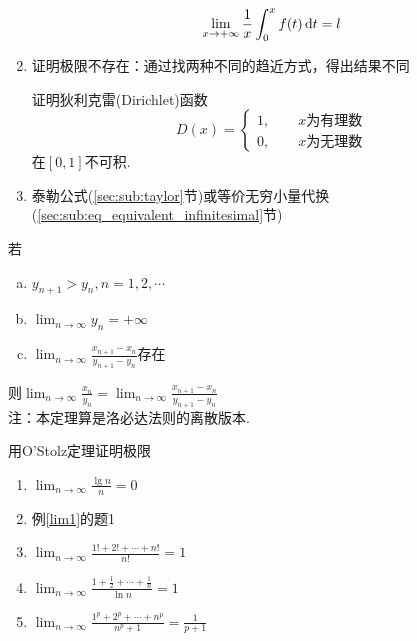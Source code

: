 \begin{enumerate}
\begin{exercise}
	\[\lim_{x\to+\infty}\frac{1}{x}\int_0^xf(t)\,\mathrm{d} t=l\]
	\end{exercise}
	\item 证明极限不存在：通过找两种不同的趋近方式，得出结果不同
	\begin{exercise}
	证明狄利克雷(Dirichlet)函数
	\[D(x)=\begin{cases}
	1,\qquad x\mbox{为有理数}\\
	0,\qquad x\mbox{为无理数}\end{cases}\]
	在$[0,1]$不可积.
	\end{exercise}
	\item 泰勒公式(\ref{sec:sub:taylor}节)或等价无穷小量代换(\ref{sec:sub:eq_equivalent_infinitesimal}节)
\end{enumerate}
\begin{theorem}%
若\begin{enumerate}[(a)]
	\item $y_{n+1}>y_n,n=1,2,\cdots$
	\item $\displaystyle\lim_{n\to\infty}y_n=+\infty$
	\item $\displaystyle\lim_{n\to\infty}\frac{x_{n+1}-x_n}{y_{n+1}-y_n}$存在
\end{enumerate}
则$\displaystyle\lim_{n\to\infty}\frac{x_n}{y_n}=\lim_{n\to\infty}\frac{x_{n+1}-x_n}{y_{n+1}-y_n}$\\
注：本定理算是洛必达法则的离散版本.
\end{theorem}
\begin{exercise}
用O'Stolz定理证明极限
\begin{enumerate}
	\item $\displaystyle\lim_{n\to\infty}\frac{\lg n}{n}=0$
	\item 例\ref{lim1}的题1
	\item $\displaystyle\lim_{n\to\infty}\frac{1!+2!+\cdots+n!}{n!}=1$
	\item $\displaystyle\lim_{n\to\infty}\frac{1+\frac{1}{2}+\cdots+\frac{1}{n}}{\ln n}=1$
	\item $\displaystyle\lim_{n\to\infty}\frac{1^p+2^p+\cdots+n^p}{n^p+1}=\frac{1}{p+1}$
\end{enumerate}
\end{exercise}

